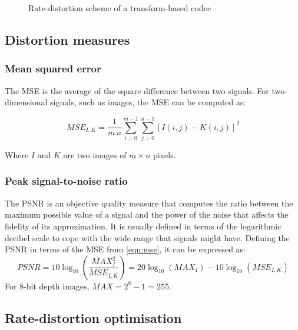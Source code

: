 \documentclass[11pt,a4paper,openright,twoside]{book}
\numberwithin{equation}{section} %
\numberwithin{figure}{section} %
\numberwithin{table}{section} %
\begin{document}
\begin{figure}[tb]
	\centering
	
	\caption{Rate-distortion scheme of a transform-based codec}
	\label{fig:rate_distortion_scheme}
\end{figure}

\subsection{Distortion measures}
\label{sub:distortion_measures}

\subsubsection{Mean squared error}
\label{ssub:mean_squared_error}

The \ac{MSE} is the average of the square difference between two
signals.
For two-dimensional signals, such as images, the \ac{MSE} can be computed as:

\begin{equation}
	MSE_{I,K} = \frac{1}{m\,n} \sum\limits_{i=0}^{m-1} \sum\limits_{j=0}^{n-1}
	{\left[ I(i,j) - K(i,j) \right]} ^2
	\label{eqn:mse}
\end{equation}

Where $I$ and $K$ are two images of $m \times n$ pixels.

\subsubsection{Peak signal-to-noise ratio}
\label{ssub:peak_signal_to_noise_ratio}

The \ac{PSNR} is an objective quality measure that computes the ratio
between the maximum possible value of a signal and the power of the
noise that affects the fidelity of its approximation.
It is usually defined in terms of the logarithmic decibel scale to cope
with the wide range that signals might have.
Defining the \ac{PSNR} in terms of the \ac{MSE} from
\eqref{eqn:mse}, it can be expressed as:
\begin{equation}
	PSNR = 10 \log_{10} \left(\frac{MAX_I^2}{MSE_{I,K}}\right)
	= 20 \log_{10} (MAX_I) - 10 \log_{10} (MSE_{I,K})
	\label{eqn:psnr}
\end{equation}
For 8-bit depth images, $MAX = 2^{8} - 1 = 255$.

\subsection{Rate-distortion optimisation}
\label{sub:rate_distortion_optimisation}
\end{document}
